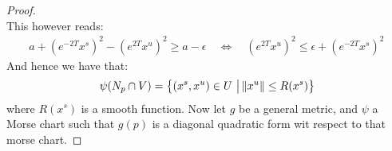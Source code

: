 \begin{proof}
\begin{equation}
\end{equation}
This however reads: 
\begin{align*}
     a+{( e^{-2T}x^s)}^2-(e^{2T}x^u)^2  \geq a-\epsilon  \quad \Leftrightarrow \quad (e^{2T}x^u)^2 \leq \epsilon+ {( e^{-2T}x^s)}^2 \, 
\end{align*}And hence we have that:
\begin{equation*}
    \psi(N_p\cap V)=\left\{(x^s,x^u)\in U ~\middle|~\norm{x^u}\leq R(x^s)\right\}
\end{equation*} where $R(x^s)$ is a smooth function. Now let $g$ be a general metric, and $\psi$ a Morse chart such that $g(p)$ is a diagonal quadratic form wit respect to that morse chart. 
\end{proof}


\begin{comment}[Müll]
	\begin{lemma}
		If $(x_1,...,x_m)$ is a local coordinate system arround a critical point $p\in M$ and let $\left( \frac{\partial}{\partial x_1},\dots ,\frac{\partial}{\partial x_m}\right)$ be the induced basis of $T_pM$.  Then the Matrix of the differential of the gradient $\grad(f): U \to \R^m$ inj $p$ is of the form:
		\begin{align*}
			\frac{\partial}{\partial x}\grad(f)\Big|_p=\left(\sum_{k} g^{ki}\frac{\partial ^2 f }{\partial x_j \partial x_k} \right)_{ij}
		\end{align*}
	\end{lemma}
	

\end{comment}
